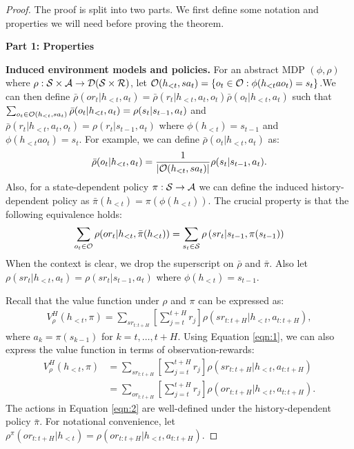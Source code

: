 \begin{proof}
    The proof is split into two parts. We first define some notation and properties we will need before proving the theorem.

    \noindent\textbf{Part 1: Properties}
    
    \noindent \textbf{Induced environment models and policies.}
    For an abstract MDP $(\phi, \rho)$ where $\rho: \mathcal{S} \times \mathcal{A} \to \mathcal{D}(\mathcal{S} \times \mathcal{R})$, let $\mathcal{O}(h_{<t}, sa_t) = \{o_t \in \mathcal{O} : \phi(h_{<t}ao_t) = s_t\}$.We can then define $\bar{\rho}(or_t | h_{<t}, a_t) = \bar{\rho}(r_t | h_{<t}, a_t, o_t) \bar{\rho}(o_t | h_{<t}, a_t)$ such that 
    $\sum_{o_t \in \mathcal{O}(h_{<t}, sa_t)} \bar{\rho}(o_t | h_{<t}, a_t) = \rho(s_t | s_{t-1}, a_t)$ and $\bar{\rho}(r_t | h_{<t}, a_t, o_t) = \rho(r_t | s_{t-1}, a_t)$ where $\phi(h_{<t}) = s_{t-1}$ and $\phi(h_{<t}ao_t) = s_t$. 
    For example, we can define $\bar{\rho}(o_{t} | h_{<t}, a_t)$ as:
    \begin{align*}
        \bar{\rho}(o_t | h_{<t}, a_t) = \frac{1}{\lvert \mathcal{O}(h_{<t}, sa_t) \rvert} \rho(s_t | s_{t-1}, a_t).
    \end{align*}
    Also, for a state-dependent policy $\pi: \mathcal{S} \to \mathcal{A}$ we can define the induced history-dependent policy as $\bar{\pi}(h_{<t}) = \pi(\phi(h_{<t}))$. The crucial property is that the following equivalence holds:
    \begin{multline}
        \sum_{o_t \in \mathcal{O}} \rho(or_t | h_{<t}, \bar{\pi}(h_{<t}))
        = \sum_{s_t \in \mathcal{S}} \rho\left(sr_t | s_{t-1}, \pi(s_{t-1})\right) \label{eqn:1}
    \end{multline}
    When the context is clear, we drop the superscript on $\bar{\rho}$ and $\bar{\pi}$. Also let $\rho(sr_t | h_{<t}, a_t) = \rho(sr_t | s_{t-1}, a_t)$ where $\phi(h_{<t}) = s_{t-1}$.

    Recall that the value function under $\rho$ and $\pi$ can be expressed as:
    \begin{align*}
        V^{H}_{\rho}(h_{<t}, \pi) = \sum_{sr_{t:t+H}} \left[ \sum_{j=t}^{t+H} r_j \right] \rho(sr_{t:t+H} | h_{<t}, a_{t:t+H}),
    \end{align*}
    where $a_k = \pi(s_{k-1})$ for $k = t, \ldots, t+H$. 
    Using Equation \ref{eqn:1}, we can also express the value function in terms of observation-rewards:
    \begin{align}
        V_{\rho}^{H}(h_{<t}, \pi) &= \sum_{sr_{t:t+H}} \left[ \sum_{j=t}^{t+H} r_j \right] \rho(sr_{t:t+H} | h_{<t}, a_{t:t+H}) \nonumber\\
        &= \sum_{or_{t:t+H}} \left[ \sum_{j=t}^{t+H} r_j \right] \rho(or_{t:t+H} | h_{<t}, a_{t:t+H}). \label{eqn:2}
    \end{align}
    The actions in Equation \ref{eqn:2} are well-defined under the history-dependent policy $\bar{\pi}$.
    For notational convenience, let $\rho^{\pi}(or_{t:t+H} | h_{<t}) = \rho(or_{t:t+H} | h_{<t}, a_{t:t+H})$. 
 

\end{proof}
